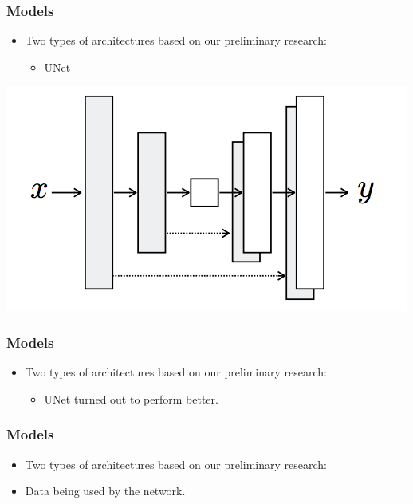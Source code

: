 \documentclass[18pt]{beamer}
\begin{document}
\begin{frame}[t]
  \frametitle{Models}
  \begin{itemize}
  \item Two types of architectures based on our preliminary research:
    \begin{itemize}
    \item UNet
    \end{itemize}
  \end{itemize}

  \vspace{1cm}
  \begin{center}
    \includegraphics[scale=0.37]{images/nets/unet}
  \end{center}
  
\end{frame}


\begin{frame}[t]
  \frametitle{Models}
  \begin{itemize}
  \item Two types of architectures based on our preliminary research:
    \begin{itemize}
    \item UNet turned out to perform better.
    \end{itemize}
  \end{itemize}
\end{frame}


\begin{frame}[t]
  \frametitle{Models}
  \begin{itemize}
  \item Two types of architectures based on our preliminary research:
  \item Data being used by the network.
  \end{itemize}
\end{frame}
\end{document}
